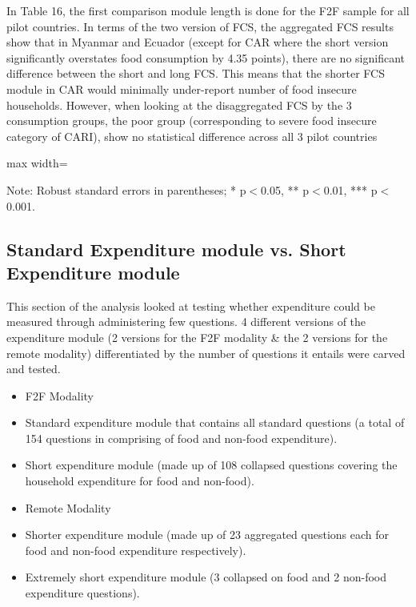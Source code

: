 \documentclass[11pt,harvard]{article}
\begin{document}
In Table 16, the first comparison module length is done for the F2F sample for all pilot countries. In terms of the two version of FCS, the aggregated FCS results show that in Myanmar and Ecuador (except for CAR where the short version significantly overstates food consumption by 4.35 points), there are no significant difference between the short and long FCS. This means that the shorter FCS module in CAR would minimally under-report number of food insecure households. 
However, when looking at the disaggregated FCS by the 3 consumption groups, the poor group (corresponding to severe food insecure category of CARI), show no statistical difference across all 3 pilot countries

\begin{table}[htbp]
	\centering
	\begin{adjustbox}{max width=\textwidth}
		\begin{threeparttable}
			\caption{Impact of Module Length on FCS Reporting}
			\scriptsize
			 
			\label{tab:FCS_F2F_Form_Length_All_Country}
			\begin{tablenotes}
				\item Note: Robust standard errors in parentheses; * p$<$0.05, ** p$<$0.01, *** p$<$0.001. 
			\end{tablenotes}
		\end{threeparttable}
	\end{adjustbox}
\end{table}



\subsection{Standard Expenditure module vs. Short Expenditure module}

This section of the analysis looked at testing whether expenditure could be measured through administering few questions. 4 different versions of the expenditure module (2 versions for the F2F modality \& the 2 versions for the remote modality) differentiated by the number of questions it entails were carved and tested.

\begin{itemize}[label=--, left=1.5em]
	\item F2F Modality
	\item[1.] Standard expenditure module that contains all standard questions (a total of 154 questions in comprising of food and non-food expenditure).
	\item[2.] Short expenditure module (made up of 108 collapsed questions covering the household expenditure for food and non-food).
	\item Remote Modality
	\item[1.] Shorter expenditure module (made up of 23 aggregated questions each for food and non-food expenditure respectively).
	\item[2.] Extremely short expenditure module (3 collapsed on food and 2 non-food expenditure questions).
\end{itemize}
\end{document}
